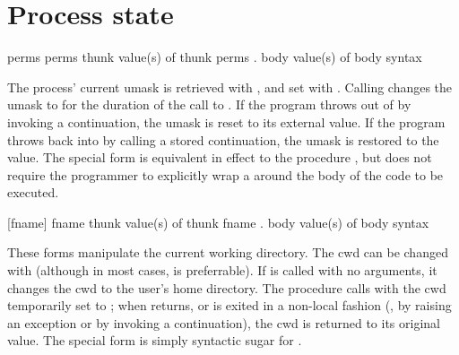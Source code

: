 

\section{Process state}

 \fixnum
{} {perms} \undefined
{} {perms thunk} {value(s) of thunk}
  {perms . body} {value(s) of body} {syntax}
\begin{desc}
    The process' current umask is retrieved with , and set with
    . Calling  changes the umask
    to  for the duration of the call to .  If the
    program throws out of  by invoking a continuation, the umask is
    reset to its external value. If the program throws back into 
    by calling a stored continuation, the umask is restored to the 
    value. The special form  is equivalent in effect to
    the procedure , but does not require the programmer
    to explicitly wrap a \ex{(\l{} \ldots)} around the body of the code
    to be executed.
\end{desc}



 {[fname]} \undefined
{} \str
{} {fname thunk}  {value(s) of thunk}
  {fname . body} {value(s) of body} {syntax}
\begin{desc}
These forms manipulate the current working directory.
The cwd can be changed with  
(although in most cases,  is preferrable).
If  is called with no arguments, it changes the cwd to
the user's home directory.
The  procedure calls  with the cwd temporarily
set to ; when  returns, or is exited in a non-local
fashion (\eg, by raising an exception or by invoking a continuation),
the cwd is returned to its original value.
The special form  is simply syntactic sugar for .
\end{desc}

